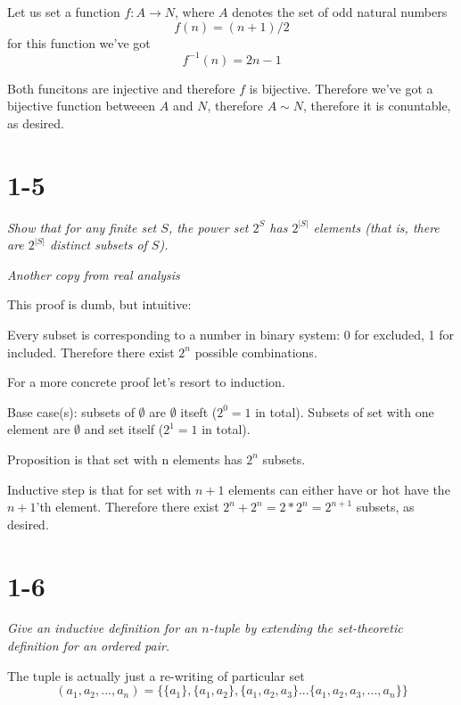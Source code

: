 \documentclass[11pt,oneside,titlepage]{book}
\begin{document}
Let us set a function $f: A \to N$, where $A$ denotes the set of
odd natural numbers
$$f(n) = (n + 1) / 2$$
for this function  we've got
$$f^{-1}(n) = 2n - 1$$

Both funcitons are injective and therefore $f$ is bijective. Therefore
we've got a bijective function betweeen $A$ and $N$, therefore
$A \sim N$, therefore it is conuntable, as desired.

\section*{1-5}
\textit{Show that for any finite set $S$, the power set $2^S$ has
  $2^{|S|}$ elements (that is, there are $2^{|S|}$ distinct subsets of $S$).}

\textit{Another copy from real analysis}

This proof is dumb, but intuitive:

Every subset is corresponding to a number in binary system: 0 for excluded,
1 for included. Therefore there exist $2^n$ possible combinations.

For a more concrete proof let's resort to induction.

Base case(s): subsets of $\emptyset$ are $\emptyset$ itseft
($2^0 = 1$ in total). Subsets of
set with one element are $\emptyset$ and set itself ($2^1 = 1$ in total).

Proposition is that set with n elements has $2^n$ subsets.

Inductive step is that for set with $n + 1$ elements can either have or hot
have the $n + 1$'th element. Therefore there exist $2^n + 2^n = 2 * 2^n =
2^{n + 1}$ subsets, as desired.

\section*{1-6}
\textit{Give an inductive definition for an $n$-tuple by extending the
  set-theoretic definition for an ordered pair.}

The tuple is actually just a re-writing of particular set
$$(a_1, a_2, ..., a_n) = \{\{a_1\}, \{a_1, a_2\}, \{a_1, a_2, a_3\} ...
\{a_1, a_2, a_3, ..., a_n\}\}$$
\end{document}
